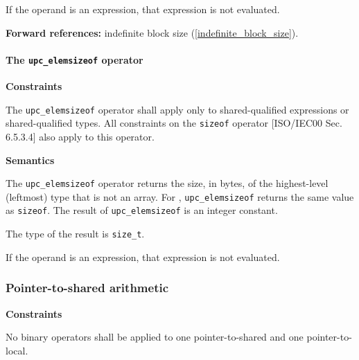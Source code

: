 \np If the operand is an expression, that expression
     is not evaluated.

      {\bf Forward references:} indefinite block size (\ref{indefinite_block_size}).  
      

\paragraph{The {\tt\bf upc\_elemsizeof} operator}

{\bf Constraints} 

\npf The {\tt upc\_elemsizeof} operator shall apply only to
     {shared-qualified expressions or shared-qualified types}.
     All constraints on the {\tt sizeof} operator
     [ISO/IEC00 Sec. 6.5.3.4] also apply to this operator.

{\bf Semantics} 

\np The {\tt upc\_elemsizeof} operator returns the size, in bytes,
     of the 
     {highest-level (leftmost) type that is not an array.}  For
     , 
     {\tt upc\_elemsizeof} returns the same value as {\tt sizeof}. The
     result of {\tt upc\_elemsizeof} is an integer constant.

\np The type of the result is {\tt size\_t}. 

\np If the operand is an expression, that expression
     is not evaluated.

\subsubsection{Pointer-to-shared arithmetic}
\label{pointer-arithmetic}
{\bf Constraints} 

\npf No binary operators shall be applied to one pointer-to-shared
    and one pointer-to-local.


